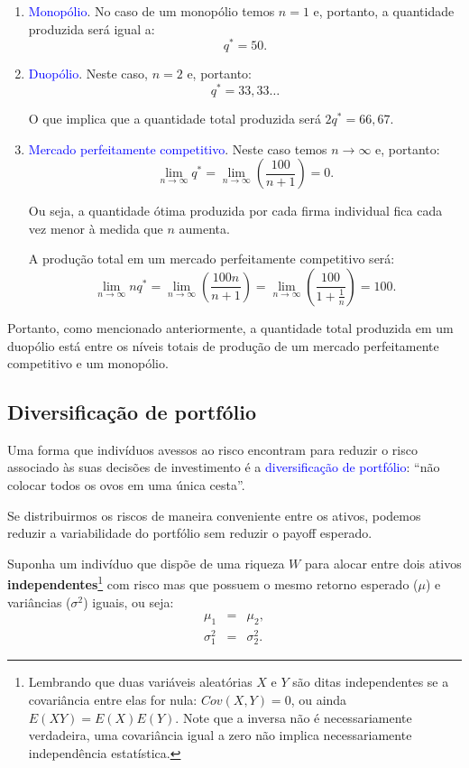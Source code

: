 \documentclass[preprintnumbers,nofootinbib,amsmath,amssymb,12pt]{article}
\begin{document}
\begin{enumerate}
    \item \textcolor{blue}{Monopólio}. No caso de um monopólio temos $n = 1$ e, portanto, a quantidade produzida será igual a:
    \[
    q^* = 50.
    \]
    \item \textcolor{blue}{Duopólio}. Neste caso, $n = 2$ e, portanto:
    \[
    q^* = 33,33\dots
    \]
    
    O que implica que a quantidade total produzida será $2q^* = 66,67$.
    
    \item \textcolor{blue}{Mercado perfeitamente competitivo}. Neste caso temos $n \to \infty$ e, portanto:
    \[
    \lim_{n\to\infty} q^* = \lim_{n\to\infty} \left(\frac{100}{n+1}\right) = 0.
    \]
    
    Ou seja, a quantidade ótima produzida por cada firma individual fica cada vez menor à medida que $n$ aumenta.
    
    A produção total em um mercado perfeitamente competitivo será:
    \[
    \lim_{n\to\infty} nq^* = \lim_{n\to\infty} \left(\frac{100n}{n+1}\right) = \lim_{n\to\infty} \left(\frac{100}{1+\frac{1}{n}}\right) = 100.
    \]
\end{enumerate}

Portanto, como mencionado anteriormente, a quantidade total produzida em um duopólio está entre os níveis totais de produção de um mercado perfeitamente competitivo e um monopólio.
\newpage
\subsection{Diversificação de portfólio}
Uma forma que indivíduos avessos ao risco encontram para reduzir o risco associado às suas decisões de investimento é a \textcolor{blue}{diversificação de portfólio}: ``não colocar todos os ovos em uma única cesta''.

Se distribuirmos os riscos de maneira conveniente entre os ativos, podemos reduzir a variabilidade do portfólio sem reduzir o payoff esperado.

Suponha um indivíduo que dispõe de uma riqueza $W$ para alocar entre dois ativos \textbf{independentes}\footnote{Lembrando que duas variáveis aleatórias $X$ e $Y$ são ditas independentes se a covariância entre elas for nula: $Cov(X,Y) = 0$, ou ainda $E(XY) = E(X)E(Y)$. Note que a inversa não é necessariamente verdadeira, uma covariância igual a zero não implica necessariamente independência estatística.} com risco mas que possuem o mesmo retorno esperado ($\mu$) e variâncias ($\sigma^2$) iguais, ou seja:
\begin{eqnarray}
\mu_1 &=& \mu_2, \label{eq20} \\
\sigma_1^2 &=& \sigma_2^2. \label{eq21}
\end{eqnarray}
\end{document}
